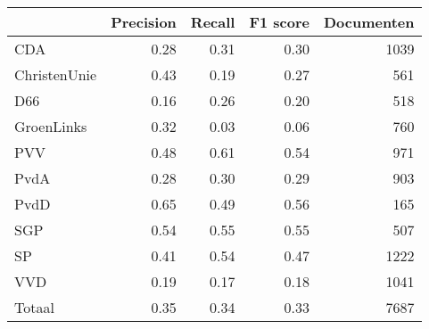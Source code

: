 \begin{tabular}{lrrrr}
\toprule
{} &  Precision &  Recall &  F1 score &  Documenten \\
\midrule
CDA          &       0.28 &    0.31 &      0.30 &        1039 \\
ChristenUnie &       0.43 &    0.19 &      0.27 &         561 \\
D66          &       0.16 &    0.26 &      0.20 &         518 \\
GroenLinks   &       0.32 &    0.03 &      0.06 &         760 \\
PVV          &       0.48 &    0.61 &      0.54 &         971 \\
PvdA         &       0.28 &    0.30 &      0.29 &         903 \\
PvdD         &       0.65 &    0.49 &      0.56 &         165 \\
SGP          &       0.54 &    0.55 &      0.55 &         507 \\
SP           &       0.41 &    0.54 &      0.47 &        1222 \\
VVD          &       0.19 &    0.17 &      0.18 &        1041 \\
Totaal       &       0.35 &    0.34 &      0.33 &        7687 \\
\bottomrule
\end{tabular}

